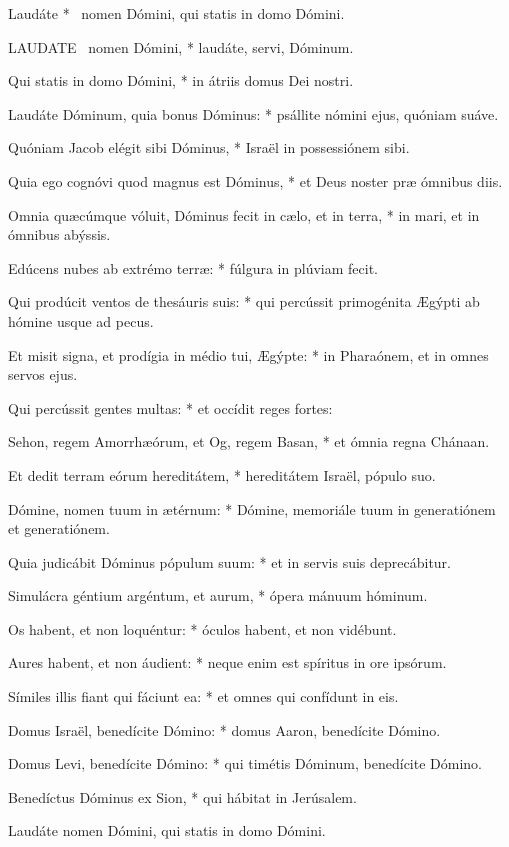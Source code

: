  Laudáte * \textdagger\ nomen Dómini, qui statis in domo Dómini.


\lettrine[lines=2]{L}{AUDATE} \textdagger\ nomen Dómini, * laudáte, servi, Dóminum.

Qui statis in domo Dómini, * in átriis domus Dei nostri.

Laudáte Dóminum, quia bonus Dóminus: * psállite nómini ejus, quóniam suáve.

Quóniam Jacob elégit sibi Dóminus, * Israël in possessiónem sibi.

Quia ego cognóvi quod magnus est Dóminus, * et Deus noster præ ómnibus diis.

Omnia quæcúmque vóluit, Dóminus fecit in cælo, et in terra, * in mari, et in ómnibus abýssis.

Edúcens nubes ab extrémo terræ: * fúlgura in plúviam fecit.

Qui prodúcit ventos de thesáuris suis: * qui percússit primogénita Ægýpti ab hómine usque ad pecus.

Et misit signa, et prodígia in médio tui, Ægýpte: * in Pharaónem, et in omnes servos ejus.

Qui percússit gentes multas: * et occídit reges fortes:

Sehon, regem Amorrhæórum, et Og, regem Basan, * et ómnia regna Chánaan.

Et dedit terram eórum hereditátem, * hereditátem Israël, pópulo suo.

Dómine, nomen tuum in ætérnum: * Dómine, memoriále tuum in generatiónem et generatiónem.

Quia judicábit Dóminus pópulum suum: * et in servis suis deprecábitur.

Simulácra géntium argéntum, et aurum, * ópera mánuum hóminum.

Os habent, et non loquéntur: * óculos habent, et non vidébunt.

Aures habent, et non áudient: * neque enim est spíritus in ore ipsórum.

Símiles illis fiant qui fáciunt ea: * et omnes qui confídunt in eis.

Domus Israël, benedícite Dómino: * domus Aaron, benedícite Dómino.

Domus Levi, benedícite Dómino: * qui timétis Dóminum, benedícite Dómino.

Benedíctus Dóminus ex Sion, * qui hábitat in Jerúsalem.

 Laudáte nomen Dómini, qui statis in domo Dómini.

